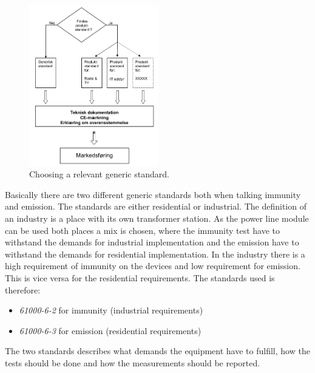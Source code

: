 \begin{figure}[H]
	\begin{centering}
		 \includegraphics[width=0.5\textwidth]{images/choose_hormonic_standard.png}
		\caption{Choosing a relevant generic standard.}
	\end{centering}
\end{figure}
Basically there are two different generic standards both when talking immunity and emission. The standards are either residential or industrial. The definition of an industry is a place with its own transformer station. As the power line module can be used both places a mix is chosen, where the immunity test have to withstand the demands for industrial implementation and the emission have to withstand the demands for residential implementation. In the industry there is a high requirement of immunity on the devices and low requirement for emission. This is vice versa for the residential requirements. The standards used is therefore:
	\begin{itemize}
		\item \textit{61000-6-2} for immunity (industrial requirements)
		\item \textit{61000-6-3} for emission (residential requirements)
	\end{itemize}
The two standards describes what demands the equipment have to fulfill, how the tests should be done and how the measurements should be reported. 
